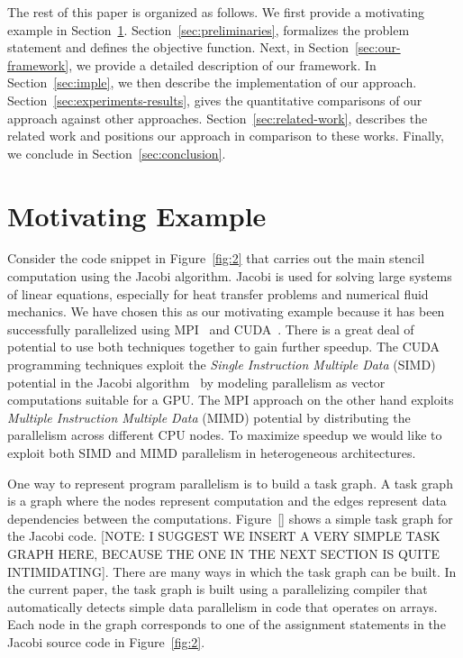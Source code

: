 The rest of this paper is organized as follows. We first provide a
motivating example in
Section~\ref{sec:motivating-example}. Section~\ref{sec:preliminaries},
formalizes the problem statement and defines the objective
function. Next, in Section~\ref{sec:our-framework}, we provide a
detailed description of our framework. In Section~\ref{sec:imple}, we
then describe the implementation of our
approach. Section~\ref{sec:experiments-results}, gives the quantitative
comparisons of our approach against other
approaches. Section~\ref{sec:related-work}, describes the related work
and positions our approach in comparison to these works.  Finally, we
conclude in Section~\ref{sec:conclusion}.

\section{Motivating Example}
\label{sec:motivating-example}
Consider the code snippet in Figure~\ref{fig:2} that carries out the
main stencil computation using the Jacobi algorithm. Jacobi is used
for solving large systems of linear equations, especially for heat
transfer problems and numerical fluid mechanics. We have chosen this
as our motivating example because it has been successfully
parallelized using MPI~\cite{jacobi1} and CUDA~\cite{jacobi2}.  There
is a great deal of potential to use both techniques together to gain
further speedup. The CUDA programming techniques exploit the
\textit{Single Instruction Multiple Data} (SIMD) potential in the
Jacobi algorithm~\cite{jacobi2} by modeling parallelism as vector
computations suitable for a GPU. The MPI approach on the other hand
exploits \textit{Multiple Instruction Multiple Data} (MIMD) potential
by distributing the parallelism across different CPU nodes. To
maximize speedup we would like to exploit both SIMD and MIMD
parallelism in heterogeneous architectures.

One way to represent program parallelism is to build a task graph.  A
task graph is a graph where the nodes represent computation and the
edges represent data dependencies between the computations.
Figure~\ref{} shows a simple task graph for the Jacobi code. [NOTE: I
  SUGGEST WE INSERT A VERY SIMPLE TASK GRAPH HERE, BECAUSE THE ONE IN
  THE NEXT SECTION IS QUITE INTIMIDATING]. There are many ways in
which the task graph can be built. In the current paper, the task
graph is built using a parallelizing compiler that automatically
detects simple data parallelism in code that operates on arrays.  Each
node in the graph corresponds to one of the assignment statements in
the Jacobi source code in Figure~\ref{fig:2}.

